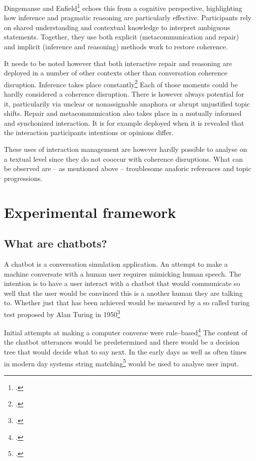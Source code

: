 \documentclass[12pt]{report}
\begin{document}
{\par
Dingemanse and Enfield\footcite{DINGEMANSE202430} echoes this from a cognitive perspective,
highlighting how inference and pragmatic reasoning are particularly effective.
Participants rely on shared understanding and contextual knowledge to interpret ambiguous statements.
Together, they use both
explicit (metacommunication and repair) and
implicit (inference and reasoning)
methods work to restore coherence.

\par
It needs to be noted however that both interactive repair and reasoning are
deployed in a number of other contexts
other than conversation coherence disruption.
Inference takes place constantly\footcite{garfinkelstudies}
Each of those moments could be hardly considered a coherence disruption.
There is however always potential for it,
particularily via unclear or nonassignable anaphora or abrupt unjustified topic shifts.
Repair and metacommunication also takes place in a mutually informed and synchonized interaction.
It is for example deployed when it is revealed
that the interaction participants intentions or opinions differ.

\par
These uses of interaction management are however
hardly possible to analyse on a textual level
since they do not cooccur with coherence disruptions.
What can be observed are – as mentioned above –
troublesome anaforic references and topic progressions.


%

\chapter{Experimental framework}

\section{What are chatbots?}
\par
A chatbot is a conversation simulation application.
An attempt to make a machine conversate with a human user requires mimicking human speech.
The intention is to have a user interact with a chatbot
that would communicate so well that
the user would be convinced
this is a another human they are talking to.
Whether just that has been achieved would be measured by a so called turing test
proposed by Alan Turing in 1950\footcite{turing1950computing}

\par
Initial attempts at making a computer converse were rule–based\footcite[p.~43]{mctear2020conversational}
The content of the chatbot utterances
would be predetermined
and there would be a decision tree that would decide what to say next.
In the early days as well as often times in modern day systems
string matching\footcite{stringmatching} would be used to analyse user input.

}
\end{document}
